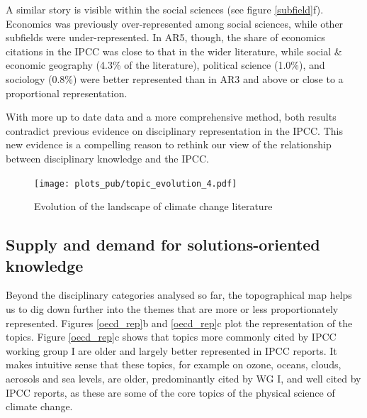 \documentclass{article}
\begin{document}
\begin{linenumbers}
A similar story is visible within the social sciences (see figure \ref{subfield}f). 
Economics was previously over-represented among social sciences, while other subfields were under-represented.
In AR5, though, the share of economics citations in the IPCC was close to that in the wider literature, while social \& economic geography (4.3\% of the literature), political science (1.0\%), and sociology (0.8\%) were better represented than in AR3 and above or close to a proportional representation. 

With more up to date data and a more comprehensive method, both results contradict previous evidence on disciplinary representation in the IPCC. This new evidence is a compelling reason to rethink our view of the relationship between disciplinary knowledge and the IPCC. %


\begin{figure}
	\begin{center}
		\texttt{[image: plots\_pub/topic\_evolution\_4.pdf]}
		\caption{Evolution of the landscape of climate change literature}
		\label{evolution-map}
	\end{center}
\end{figure}

\subsection*{Supply and demand for solutions-oriented knowledge}

Beyond the disciplinary categories analysed so far, the topographical map helps us to dig down further into the themes that are more or less proportionately represented. Figures \ref{oecd_rep}b and \ref{oecd_rep}c plot the representation of the topics. Figure \ref{oecd_rep}c shows that topics more commonly cited by IPCC working group I are older and largely better represented in IPCC reports. It makes intuitive sense that these topics, for example on ozone, oceans, clouds, aerosols and sea levels, are older, predominantly cited by WG I, and well cited by IPCC reports, as these are some of the core topics of the physical science of climate change.


\end{linenumbers}
\end{document}
